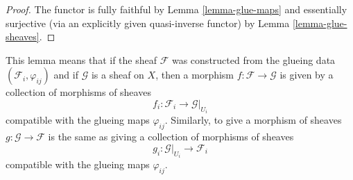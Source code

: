 \begin{proof}
The functor is fully faithful by
Lemma \ref{lemma-glue-maps}
and essentially surjective (via an explicitly given quasi-inverse functor) by
Lemma \ref{lemma-glue-sheaves}.
\end{proof}

\noindent
This lemma means that if the sheaf $\mathcal{F}$ was constructed
from the glueing data $(\mathcal{F}_i, \varphi_{ij})$
and if $\mathcal{G}$ is a sheaf on $X$, then a morphism
$f : \mathcal{F} \to \mathcal{G}$ is given by a collection of
morphisms of sheaves
$$
f_i : \mathcal{F}_i \longrightarrow \mathcal{G}|_{U_i}
$$
compatible with the glueing maps $\varphi_{ij}$. Similarly,
to give a morphism of sheaves $g : \mathcal{G} \to \mathcal{F}$
is the same as giving a collection of morphisms of sheaves
$$
g_i : \mathcal{G}|_{U_i} \longrightarrow \mathcal{F}_i
$$
compatible with the glueing maps $\varphi_{ij}$.










